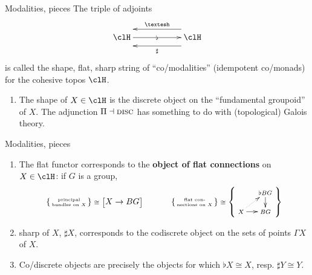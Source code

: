 \documentclass[presentation]{beamer}
\begin{document}
%
%
%
%
%
%
%
%
%
\begin{frame}{Modalities, pieces}
	The triple of adjoints
	\[
		\xymatrix@C=2cm{
		\clH
		\ar[r]|\flat
		\ar@{<-}@<10pt>[r]^\shape
		\ar@{<-}@<-10pt>[r]_\sharp &
		\clH
		}
	\]
	is called the \alert{shape, flat, sharp} string of ``co/modalities'' (idempotent co/monads) for the cohesive topos $\clH$.
	\begin{enumerate}
    \item<+-> The \alert{shape} of $X \in\clH$ is the discrete object on the ``fundamental groupoid'' of $X$. The adjunction $\Pi\dashv\textsc{disc}$ has something to do with (topological) Galois theory.
  \end{enumerate}
\end{frame}
\begin{frame}{Modalities, pieces}
  \begin{enumerate}
		\item<+-> The \alert{flat} functor corresponds to the \textbf{object of flat connections} on $X\in \clH$: if $G$ is a group,
		      \[\scriptsize
			      \left\{
			      \begin{smallmatrix}
				      \text{principal}\\
				      \text{bundles on $X$}
			      \end{smallmatrix}
			      \right\} \cong \Big[ X \to BG \Big]\qquad\qquad
			      \left\{
			      \begin{smallmatrix}
				      \text{flat con-}\\
				      \text{nections on $X$}
			      \end{smallmatrix}
			      \right\}
			      \cong\left\{
			      \vcenter{\xymatrix@R=4mm@C=4mm{
			      & \flat BG \ar[d]\\
			      X \ar[r]\ar@{.>}[ur]& BG
			      }}\right\}
		      \]
		      \item<+-> \alert{sharp} of $X$, $\sharp X$, corresponds to the codiscrete object on the sets of \alert{points} $\Gamma X$ of $X$.
		      \item<+-> Co/discrete objects are precisely the objects for which $\flat X \cong X$, resp. $\sharp Y \cong Y$.
	\end{enumerate}
\end{frame}
%
%
%
%
%
%
%
%
%
\end{document}
